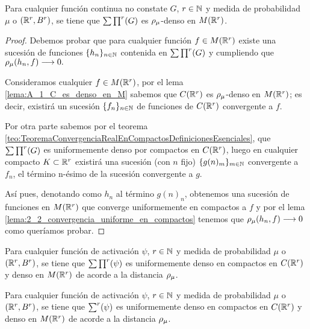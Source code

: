 %

\begin{teorema}
    Para cualquier función continua no constate $G$, $r \in \mathbb{N}$ y
    medida de probabilidad $\mu$ o $(\mathbb{R}^r, B^r)$, 
    se tiene que $\sum \prod^r (G)$ es $\rho_{\mu}$-denso en $M(\mathbb{R}^r)$. 
\end{teorema} 
\begin{proof}
    Debemos probar que para cualquier función $f \in M(\mathbb{R}^r)$ existe una 
    sucesión de funciones $\{h_n\}_{n\in \mathbb{N}}$ contenida en $\sum \prod^r (G)$ y 
    cumpliendo que $\rho_{\mu}(h_n, f) \longrightarrow 0.$
    
    Consideramos cualquier $f \in M(\mathbb{R}^r)$,
    por el lema \ref{lema:A_1_C_es_denso_en_M} sabemos que $C(\mathbb{R}^r)$ es $\rho_{\mu}$-denso en $M(\mathbb{R}^r)$; 
    es decir, existirá un sucesión $\{f_n\}_{n\in \mathbb{N}}$ de funciones de $C(\mathbb{R}^r)$ convergente a 
    $f$.  
    
    Por otra parte sabemos por el teorema \ref{teo:TeoremaConvergenciaRealEnCompactosDefinicionesEsenciales}, 
    que $\sum \prod^r (G)$ es uniformemente denso por compactos en $C(\mathbb{R}^r)$, luego en cualquier compacto 
    $K \subset \mathbb{R}^r$ existirá una sucesión (con $n$ fijo) $\{g(n)_m \} _{m \in \mathbb{N}}$ convergente 
    a $f_n$, el término n-ésimo de la sucesión convergente a $g$. 

    Así pues, denotando como $h_n$ al término $g(n)_n$, obtenemos una sucesión de funciones 
    en $M(\mathbb{R}^r)$ que converge uniformemente en compactos a $f$ y por el lema \ref{lema:2_2_convergencia_uniforme_en_compactos}
    tenemos que $\rho_{\mu}(h_n, f) \longrightarrow 0$ como queríamos probar. 

    
\end{proof}

\begin{teorema}
    Para cualquier función de activación $\psi$, $r \in \mathbb{N}$ y
    medida de probabilidad $\mu$ o $(\mathbb{R}^r, B^r)$, 
    se tiene que $\sum \prod^r (\psi)$ es uniformemente denso en compactos
    en $C(\mathbb{R}^r)$ y denso en $M(\mathbb{R}^r)$ de acorde a la distancia $\rho_{\mu}$. 
\end{teorema}

\begin{teorema}
    Para cualquier función de activación $\psi$, $r \in \mathbb{N}$ y
    medida de probabilidad $\mu$ o $(\mathbb{R}^r, B^r)$, 
    se tiene que $\sum^r (\psi)$ es uniformemente denso en compactos
    en $C(\mathbb{R}^r)$ y denso en $M(\mathbb{R}^r)$ de acorde a la distancia $\rho_{\mu}$. 
\end{teorema}